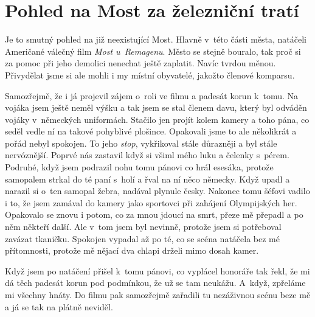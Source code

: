 
\chapter{Pohled na Most za železniční tratí}

Je to smutný pohled na již neexistující Most. Hlavně v~této části města,
natáčeli Američané válečný film {\em Most u~Remagenu}. Město se stejně bouralo,
tak proč si za pomoc při jeho demolici nenechat ještě zaplatit. Navíc tvrdou
měnou. Přivydělat jsme si ale mohli i my místní obyvatelé, jakožto členové
komparsu.

Samozřejmě, že i já projevil zájem o~roli ve filmu a padesát korun k~tomu. Na
vojáka jsem ještě neměl výšku a tak jsem se stal členem davu, který byl odváděn
vojáky v~německých uniformách. Stačilo jen projít kolem kamery a toho pána, co
seděl vedle ní na takové pohyblivé plošince. Opakovali jsme to ale několikrát a
pořád nebyl spokojen. To jeho {\em stop}, vykřikoval stále důrazněji a byl
stále nervóznější. Poprvé nás zastavil když si všiml mého luku a čelenky
s~pérem. Podruhé, když jsem podrazil nohu tomu pánovi co hrál esesáka, protože
samopalem strkal do té paní s~holí a řval na ní něco německy. Když upadl a
narazil si o~ten samopal žebra, nadával plynule česky. Nakonec tomu šéfovi
vadilo i to, že jsem zamával do kamery jako sportovci při zahájení Olympijských
her. Opakovalo se znovu i potom, co za mnou jdoucí na smrt, přeze mě přepadl a
po něm někteří další. Ale v~tom jsem byl nevinně, protože jsem si potřeboval
zavázat tkaničku. Spokojen vypadal až po té, co se scéna natáčela bez mé
přítomnosti, protože mě nějací dva chlapi drželi mimo dosah kamer.

Když jsem po natáčení přišel k~tomu pánovi, co vyplácel honoráře tak řekl, že
mi dá těch padesát korun pod podmínkou, že už se tam neukážu. A~když, zpřeláme
mi všechny hnáty. Do filmu pak samozřejmě zařadili tu nezáživnou scénu beze mě
a já se tak na plátně neviděl.

